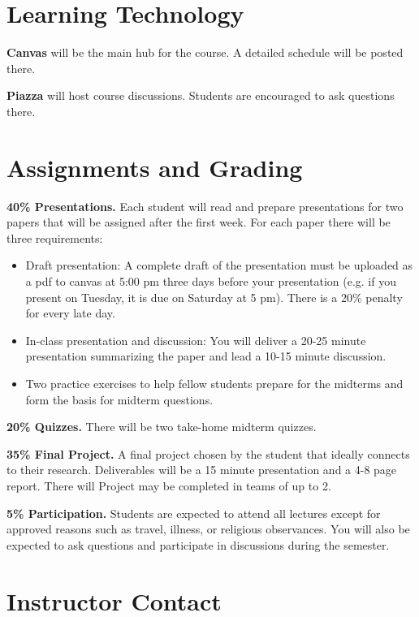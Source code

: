 \documentclass[9pt]{article}
\begin{document}
\section*{Learning Technology}

\textbf{Canvas} will be the main hub for the course. A detailed schedule will be posted there.

\textbf{Piazza} will host course discussions. Students are encouraged to ask questions there.

\section*{Assignments and Grading}

\textbf{40\% Presentations.}
Each student will read and prepare presentations for two papers that will be assigned after the first week. For each paper there will be three requirements:
\begin{itemize}[nosep]
    \item Draft presentation: A complete draft of the presentation must be uploaded as a pdf to canvas at 5:00 pm three days before your presentation (e.g. if you present on Tuesday, it is due on Saturday at 5 pm). There is a 20\% penalty for every late day.
    \item In-class presentation and discussion: You will deliver a 20-25 minute presentation summarizing the paper and lead a 10-15 minute discussion.
    \item Two practice exercises to help fellow students prepare for the midterms and form the basis for midterm questions.
\end{itemize}

\textbf{20\% Quizzes.}
There will be two take-home midterm quizzes.

\textbf{35\% Final Project.}
A final project chosen by the student that ideally connects to their research. Deliverables will be a 15 minute presentation and a 4-8 page report. There will Project may be completed in teams of up to 2.

\textbf{5\% Participation.}
Students are expected to attend all lectures except for approved reasons such as travel, illness, or religious observances. You will also be expected to ask questions and participate in discussions during the semester.

\section*{Instructor Contact}
\end{document}
